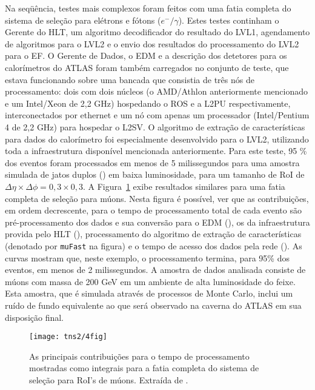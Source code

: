 Na seqüência, testes mais complexos foram feitos com uma fatia completa do
sistema de seleção para elétrons e fótons ($e^-/\gamma$). Estes testes
continham o Gerente do HLT, um algoritmo decodificador do resultado do LVL1,
agendamento de algoritmos para o LVL2 e o envio dos resultados do
processamento do LVL2 para o EF. O Gerente de Dados, o EDM e a descrição dos
detetores para os calorímetros do ATLAS foram também carregados no conjunto de
teste, que estava funcionando sobre uma bancada que consistia de três nós de
processamento: dois com dois núcleos (o AMD/Athlon anteriormente
mencionado e um Intel/Xeon de 2,2 GHz) hospedando o ROS e a L2PU
respectivamente, interconectados por
 ethernet e um nó com apenas um processador (Intel/Pentium 4 de
2,2 GHz) para hospedar o L2SV. O algoritmo de extração de características para
dados do calorímetro foi especialmente desenvolvido para o LVL2, utilizando
toda a infraestrutura disponível mencionada anteriormente. Para este teste, 95
\% dos eventos foram processados em menos de 5 milissegundos para uma amostra
simulada de jatos duplos () em baixa luminosidade, para um
tamanho de RoI de $\Delta\eta \times \Delta\phi = 0,3 \times 0,3$. A
Figura~\ref{fig:l2sc-mu} exibe resultados similares para uma fatia completa de
seleção para múons. Nesta figura é possível, ver que as contribuições, em
ordem decrescente, para o tempo de processamento total de cada evento são
pré-processamento dos dados e sua conversão para o EDM (), os  da infraestrutura provida pelo HLT
(), processamento do algoritmo de extração de características
(denotado por \texttt{muFast} na figura) e o tempo de acesso dos dados pela
rede (). As curvas mostram que, neste exemplo, o
processamento termina, para 95\% dos eventos, em menos de 2 milissegundos. A
amostra de dados analisada consiste de múons com massa de 200 GeV em um
ambiente de alta luminosidade do feixe. Esta amostra, que é simulada através
de processos de Monte Carlo, inclui um ruído de fundo equivalente ao que será
observado na caverna do ATLAS em sua disposição final.

\begin{figure}
\begin{center}
\texttt{[image: tns2/4fig]}
\end{center}
\caption{As principais contribuições para o tempo de processamento mostradas
como integrais para a fatia completa do sistema de seleção para RoI's de
múons. Extraída de \cite{hlt-tdr}.}
\label{fig:l2sc-mu}
\end{figure}



